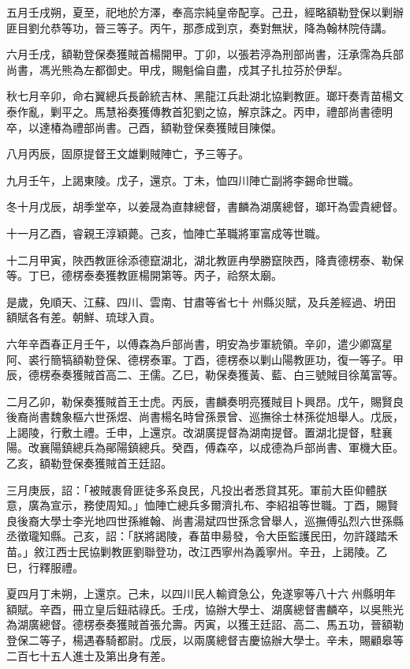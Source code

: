 \begin{pinyinscope}
五月壬戌朔，夏至，祀地於方澤，奉高宗純皇帝配享。己丑，經略額勒登保以剿辦匪目劉允恭等功，晉三等子。丙午，那彥成到京，奏對無狀，降為翰林院侍講。

六月壬戌，額勒登保奏獲賊首楊開甲。丁卯，以張若渟為刑部尚書，汪承霈為兵部尚書，馮光熊為左都御史。甲戌，賜魁倫自盡，戍其子扎拉芬於伊犁。

秋七月辛卯，命右翼總兵長齡統吉林、黑龍江兵赴湖北協剿教匪。瑯玕奏青苗楊文泰作亂，剿平之。馬慧裕奏獲傳教首犯劉之協，解京誅之。丙申，禮部尚書德明卒，以達椿為禮部尚書。己酉，額勒登保奏獲賊目陳傑。

八月丙辰，固原提督王文雄剿賊陣亡，予三等子。

九月壬午，上謁東陵。戊子，還京。丁未，恤四川陣亡副將李錫命世職。

冬十月戊辰，胡季堂卒，以姜晟為直隸總督，書麟為湖廣總督，瑯玕為雲貴總督。

十一月乙酉，睿親王淳穎薨。己亥，恤陣亡革職將軍富成等世職。

十二月甲寅，陜西教匪徐添德竄湖北，湖北教匪冉學勝竄陜西，降責德楞泰、勒保等。丁巳，德楞泰奏獲教匪楊開第等。丙子，祫祭太廟。

是歲，免順天、江蘇、四川、雲南、甘肅等省七十州縣災賦，及兵差經過、坍田額賦各有差。朝鮮、琉球入貢。

六年辛酉春正月壬午，以傅森為戶部尚書，明安為步軍統領。辛卯，遣少卿窩星阿、裘行簡犒額勒登保、德楞泰軍。丁酉，德楞泰以剿山陽教匪功，復一等子。甲辰，德楞泰奏獲賊首高二、王儒。乙巳，勒保奏獲黃、藍、白三號賊目徐萬富等。

二月乙卯，勒保奏獲賊首王士虎。丙辰，書麟奏明亮獲賊目卜興昂。戊午，賜賢良後裔尚書魏象樞六世孫煜、尚書楊名時曾孫景曾、巡撫徐士林孫從旭舉人。戊辰，上謁陵，行敷土禮。壬申，上還京。改湖廣提督為湖南提督。置湖北提督，駐襄陽。改襄陽鎮總兵為鄖陽鎮總兵。癸酉，傅森卒，以成德為戶部尚書、軍機大臣。乙亥，額勒登保奏獲賊首王廷詔。

三月庚辰，詔：「被賊裹脅匪徒多系良民，凡投出者悉貸其死。軍前大臣仰體朕意，廣為宣示，務使周知。」恤陣亡總兵多爾濟扎布、李紹祖等世職。丁酉，賜賢良後裔大學士李光地四世孫維翰、尚書湯斌四世孫念曾舉人，巡撫傅弘烈六世孫縣丞徵瓏知縣。己亥，詔：「朕將謁陵，春苗申昜發，令大臣監護民田，勿許踐踏禾苗。」敘江西士民協剿教匪劉聯登功，改江西寧州為義寧州。辛丑，上謁陵。乙巳，行釋服禮。

夏四月丁未朔，上還京。己未，以四川民人輸資急公，免遂寧等八十六州縣明年額賦。辛酉，冊立皇后鈕祜祿氏。壬戌，協辦大學士、湖廣總督書麟卒，以吳熊光為湖廣總督。德楞泰奏獲賊首張允壽。丙寅，以獲王廷詔、高二、馬五功，晉額勒登保二等子，楊遇春騎都尉。戊辰，以兩廣總督吉慶協辦大學士。辛未，賜顧皋等二百七十五人進士及第出身有差。


\end{pinyinscope}
